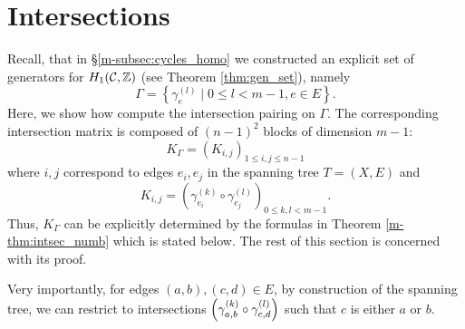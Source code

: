 \documentclass[main.tex]{subfiles}
\begin{document}
  \section{Intersections}\label{sec:intersections}

  Recall, that in \S \ref{m-subsec:cycles_homo} we constructed an explicit set of generators for $H_1(\mathcal{C},\mathbb{Z})$ (see Theorem
  \ref{thm:gen_set}), namely
  \begin{equation}
    \Gamma = \left\{  \gamma_{e}^{(l)}  \mid  0 \le l < m-1,  e \in E  \right\}.
  \end{equation}
  Here, we show how compute the intersection pairing on $\Gamma$. The corresponding intersection matrix is composed of
  $(n-1)^2$ blocks of dimension $m-1$:
  \begin{equation}
   K_{\Gamma} = \left( K_{i,j} \right)_{1\le i,j \le n-1}
  \end{equation}
  where $i,j$ correspond to edges $e_i,e_j$ in the spanning tree $T = (X,E)$ and
  \begin{equation}
    K_{i,j} = \left(\gamma_{e_i}^{(k)} \circ \gamma_{e_j}^{(l)} \right)_{0 \le k,l < m-1}.
  \end{equation}
  Thus, $K_{\Gamma}$ can be explicitly determined by the formulas in Theorem \ref{m-thm:intsec_numb} which is stated below.
  The rest of this section is concerned with its proof.

  Very importantly, for edges $(a,b),(c,d) \in E$, by construction of the spanning tree, we can restrict to intersections $\left(\gamma_{a,b}^{(k)} \circ \gamma_{c,d}^{(l)}\right)$ 
  such that $c$ is either $a$ or $b$.
\end{document}
